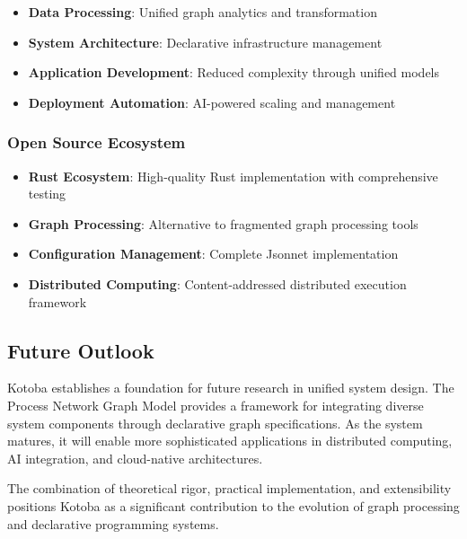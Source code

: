 \documentclass[11pt,a4paper]{article}
\begin{document}
\begin{itemize}
\item \textbf{Data Processing}: Unified graph analytics and transformation
\item \textbf{System Architecture}: Declarative infrastructure management
\item \textbf{Application Development}: Reduced complexity through unified models
\item \textbf{Deployment Automation}: AI-powered scaling and management
\end{itemize}

\subsubsection{Open Source Ecosystem}
\label{subsubsec:open_source}

\begin{itemize}
\item \textbf{Rust Ecosystem}: High-quality Rust implementation with comprehensive testing
\item \textbf{Graph Processing}: Alternative to fragmented graph processing tools
\item \textbf{Configuration Management}: Complete Jsonnet implementation
\item \textbf{Distributed Computing}: Content-addressed distributed execution framework
\end{itemize}

\subsection{Future Outlook}
\label{subsec:outlook}

Kotoba establishes a foundation for future research in unified system design. The Process Network Graph Model provides a framework for integrating diverse system components through declarative graph specifications. As the system matures, it will enable more sophisticated applications in distributed computing, AI integration, and cloud-native architectures.

The combination of theoretical rigor, practical implementation, and extensibility positions Kotoba as a significant contribution to the evolution of graph processing and declarative programming systems.



\end{document}
